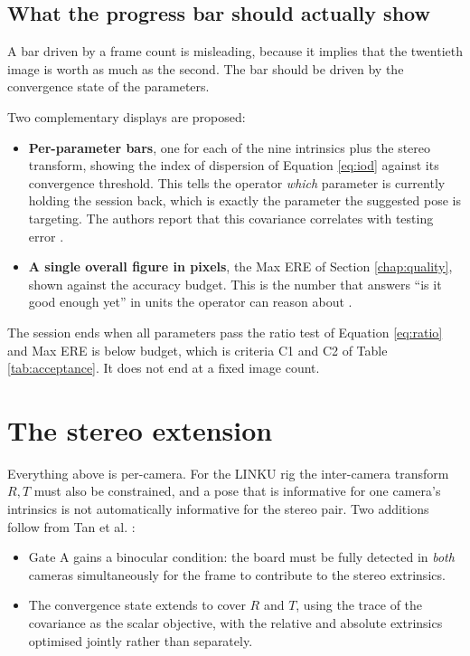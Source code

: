 \subsection{What the progress bar should actually show}

A bar driven by a frame count is misleading, because it implies that the twentieth image is worth as much as the second. The bar should be driven by the convergence state of the parameters.

Two complementary displays are proposed:

\begin{itemize}
    \item \textbf{Per-parameter bars}, one for each of the nine intrinsics plus the stereo transform, showing the index of dispersion of Equation \ref{eq:iod} against its convergence threshold. This tells the operator \emph{which} parameter is currently holding the session back, which is exactly the parameter the suggested pose is targeting. The authors report that this covariance correlates with testing error \cite{rojtberg2018pose}.
    \item \textbf{A single overall figure in pixels}, the Max ERE of Section \ref{chap:quality}, shown against the accuracy budget. This is the number that answers ``is it good enough yet'' in units the operator can reason about \cite{richardson2013aprilcal}.
\end{itemize}

The session ends when all parameters pass the ratio test of Equation \ref{eq:ratio} and Max ERE is below budget, which is criteria C1 and C2 of Table \ref{tab:acceptance}. It does not end at a fixed image count.

\section{The stereo extension}

Everything above is per-camera. For the LINKU rig the inter-camera transform $R, T$ must also be constrained, and a pose that is informative for one camera's intrinsics is not automatically informative for the stereo pair. Two additions follow from Tan et al. \cite{tan2025stereoposes}:

\begin{itemize}
    \item Gate A gains a binocular condition: the board must be fully detected in \emph{both} cameras simultaneously for the frame to contribute to the stereo extrinsics.
    \item The convergence state extends to cover $R$ and $T$, using the trace of the covariance as the scalar objective, with the relative and absolute extrinsics optimised jointly rather than separately.
\end{itemize}

